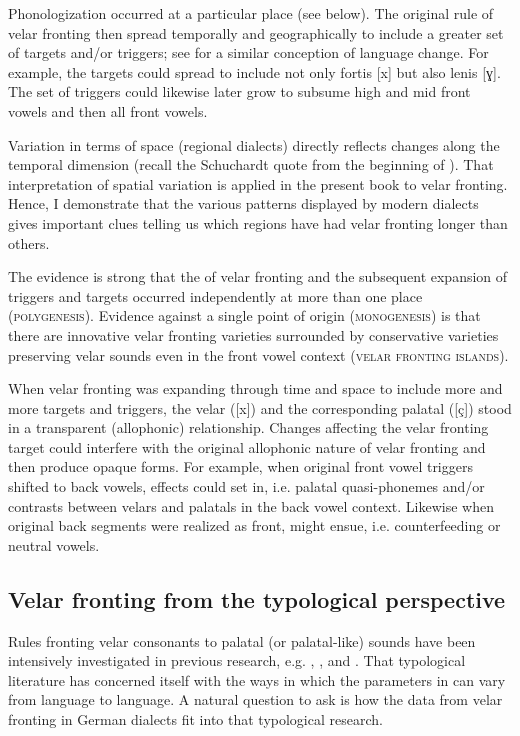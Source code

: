 Phonologization occurred at a particular place (see below). The original rule of velar fronting then spread temporally and geographically to include a greater set of targets and/or triggers; see \citet{Bermúdez-Otero2015} for a similar conception of language change. For example, the targets could spread to include not only fortis [x] but also lenis [ɣ]. The set of triggers could likewise later grow to subsume high and mid front vowels and then all front vowels.

Variation in terms of space (regional dialects) directly reflects changes along the temporal dimension (recall the Schuchardt quote from the beginning of ). That interpretation of spatial variation is applied in the present book to velar fronting. Hence, I demonstrate that the various patterns displayed by modern dialects gives important clues telling us which regions have had velar fronting longer than others.

The evidence is strong that the  of velar fronting and the subsequent expansion of triggers and targets occurred independently at more than one place (\textsc{polygenesis}). Evidence against a single point of origin (\textsc{monogenesis}) is that there are innovative velar fronting varieties surrounded by conservative varieties preserving velar sounds even in the front vowel context (\textsc{velar} \textsc{fronting} \textsc{islands}).

When velar fronting was expanding through time and space to include more and more targets and triggers, the velar ([x]) and the corresponding palatal ([ç]) stood in a transparent (allophonic) relationship. Changes affecting the velar fronting target could interfere with the original allophonic nature of velar fronting and then produce opaque forms. For example, when original front vowel triggers shifted to back vowels,  effects could set in, i.e. palatal quasi-phonemes and/or contrasts between velars and palatals in the back vowel context. Likewise when original back segments were realized as front,  might ensue, i.e. counterfeeding  or neutral vowels.

\subsection{Velar fronting from the typological perspective}\label{sec:1.4.3}

Rules fronting velar consonants to palatal (or palatal-like) sounds have been intensively investigated in previous research, e.g. \citet{Bhat1978,Guion1998, Bateman2007,Bateman2011}, \citet{Kochetov2011}, and \citet{Recasens2020}. That typological literature has concerned itself with the ways in which the parameters in  can vary from language to language. A natural question to ask is how the data from velar fronting in German dialects fit into that typological research.

